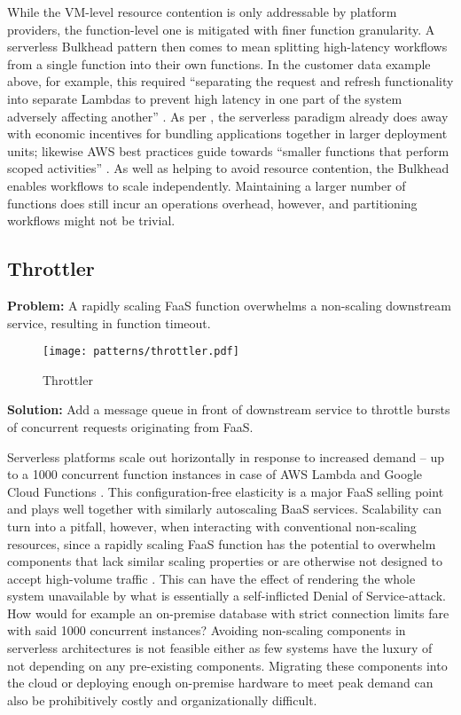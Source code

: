 While the VM-level resource contention is only addressable by platform providers, the function-level one is mitigated with finer function granularity. A serverless Bulkhead pattern then comes to mean splitting high-latency workflows from a single function into their own functions. In the customer data example above, for example, this required ``separating the request and refresh functionality into separate Lambdas to prevent high latency in one part of the system adversely affecting another'' \parencite{bardsley18optimizationStrategies}. As per \textcite{adzic2017serverless}, the serverless paradigm already does away with economic incentives for bundling applications together in larger deployment units; likewise AWS best practices guide towards ``smaller functions that perform scoped activities'' \parencite{aws18serverlessLens}. As well as helping to avoid resource contention, the Bulkhead enables workflows to scale independently. Maintaining a larger number of functions does still incur an operations overhead, however, and partitioning workflows might not be trivial.

\subsection{Throttler} \label{subsec:throttler}

\textbf{Problem:} A rapidly scaling FaaS function overwhelms a non-scaling downstream service, resulting in function timeout.

\begin{figure}[h]
  \centering
  \texttt{[image: patterns/throttler.pdf]}
  \caption{Throttler}
  \label{fig:throttler}
\end{figure}

\textbf{Solution:} Add a message queue in front of downstream service to throttle bursts of concurrent requests originating from FaaS.

Serverless platforms scale out horizontally in response to increased demand -- up to a 1000 concurrent function instances in case of AWS Lambda \parencite{awslambda0218} and Google Cloud Functions \parencite{google18cloudFunctions}. This configuration-free elasticity is a major FaaS selling point and plays well together with similarly autoscaling BaaS services. Scalability can turn into a pitfall, however, when interacting with conventional non-scaling resources, since a rapidly scaling FaaS function has the potential to overwhelm components that lack similar scaling properties or are otherwise not designed to accept high-volume traffic \parencite{cncf18serverlessWG}. This can have the effect of rendering the whole system unavailable by what is essentially a self-inflicted Denial of Service-attack. How would for example an on-premise database with strict connection limits fare with said 1000 concurrent instances? Avoiding non-scaling components in serverless architectures is not feasible either as few systems have the luxury of not depending on any pre-existing components. Migrating these components into the cloud or deploying enough on-premise hardware to meet peak demand can also be prohibitively costly and organizationally difficult.

